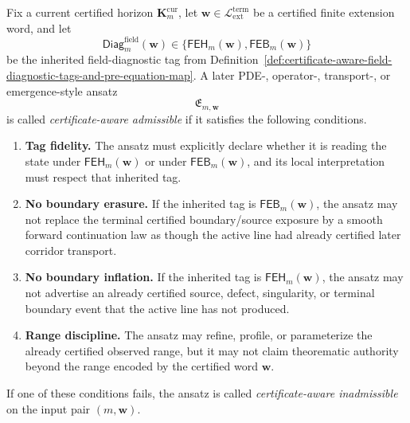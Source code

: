 \begin{definition}
\label{def:certificate-aware-admissibility-for-later-field-equation-ansatze}
Fix a current certified horizon \(\mathbf K_m^{\mathrm{cur}}\), let \(\mathbf w\in \mathcal L_{\mathrm{ext}}^{\mathrm{term}}\) be a certified finite extension word, and let
\[
 \mathsf{Diag}^{\mathrm{field}}_{m}(\mathbf w)
 \in
 \{\mathsf{FEH}_{m}(\mathbf w),\mathsf{FEB}_{m}(\mathbf w)\}
\]
be the inherited field-diagnostic tag from Definition~\ref{def:certificate-aware-field-diagnostic-tags-and-pre-equation-map}. A later PDE-, operator-, transport-, or emergence-style ansatz
\[
 \mathfrak E_{m,\mathbf w}
\]
is called \emph{certificate-aware admissible} if it satisfies the following conditions.
\begin{enumerate}[label=(\roman*)]
 \item \textbf{Tag fidelity.} The ansatz must explicitly declare whether it is reading the state under \(\mathsf{FEH}_{m}(\mathbf w)\) or under \(\mathsf{FEB}_{m}(\mathbf w)\), and its local interpretation must respect that inherited tag.
 \item \textbf{No boundary erasure.} If the inherited tag is \(\mathsf{FEB}_{m}(\mathbf w)\), the ansatz may not replace the terminal certified boundary/source exposure by a smooth forward continuation law as though the active line had already certified later corridor transport.
 \item \textbf{No boundary inflation.} If the inherited tag is \(\mathsf{FEH}_{m}(\mathbf w)\), the ansatz may not advertise an already certified source, defect, singularity, or terminal boundary event that the active line has not produced.
 \item \textbf{Range discipline.} The ansatz may refine, profile, or parameterize the already certified observed range, but it may not claim theorematic authority beyond the range encoded by the certified word \(\mathbf w\).
\end{enumerate}
If one of these conditions fails, the ansatz is called \emph{certificate-aware inadmissible} on the input pair \((m,\mathbf w)\).
\end{definition}


